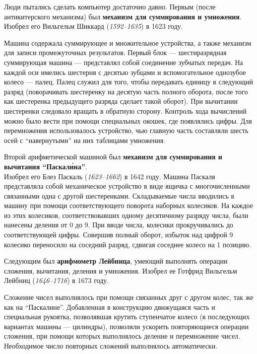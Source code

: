 Люди пытались сделать компьютер достаточно давно.
Первым (после антикитерского механизма) был \textbf{механизм для суммирования и умножения}. Изобрел его Вильгельм Шиккард (\emph{1592--1635}) в 1623 году.

Машина содержала суммирующее и множительное устройства, а также механизм для записи промежуточных результатов.
Первый блок --- шестиразрядная суммирующая машина --- представлял собой соединение зубчатых передач.
На каждой оси имелись шестерня с десятью зубцами и вспомогательное однозубое колесо --- палец.
Палец служил для того, чтобы передавать единицу в следующий разряд (поворачивать шестеренку на десятую часть полного оборота, после того как шестеренка предыдущего разряда сделает такой оборот).
При вычитании шестеренки следовало вращать в обратную сторону.
Контроль хода вычислений можно было вести при помощи специальных окошек, где появлялись цифры.
Для перемножения использовалось устройство, чью главную часть составляли шесть осей с \enquote{навернутыми} на них таблицами умножения.

\bigskip
Второй арифметической машиной был \textbf{механизм для суммирования и вычитания \enquote{Паскал\'{и}на}}. \\
Изобрел его Блез Паскаль (\emph{1623--1662}) в 1642 году.
Машина Паскаля представляла собой механическое устройство в виде ящичка с многочисленными связанными одна с другой шестеренками.
Складываемые числа вводились в машину при помощи соответствующего поворота наборных колесиков.
На каждое из этих колесиков, соответствовавших одному десятичному разряду числа, были нанесены деления от 0 до 9.
При вводе числа, колесики прокручивались до соответствующей цифры.
Совершив полный оборот, избыток над цифрой 9 колесико переносило на соседний разряд, сдвигая соседнее колесо на 1 позицию.

\bigskip
Следующим был \textbf{арифмометр Лейбница}, умеющий выполнять операции сложения, вычитания, деления и умножения. Изобрел ее Готфрид Вильгельм Лейбниц (\emph{1646--1716}) в 1673 году.

Сложение чисел выполнялось при помощи связанных друг с другом колес, так же как на \enquote{Паскалине}.
Добавленная в конструкцию движущаяся часть и специальная рукоятка, позволявшая крутить ступенчатое колесо (в последующих вариантах машины --- цилиндры), позволяли ускорить повторяющиеся операции сложения, при помощи которых выполнялось деление и перемножение чисел.
Необходимое число повторных сложений выполнялось автоматически.

